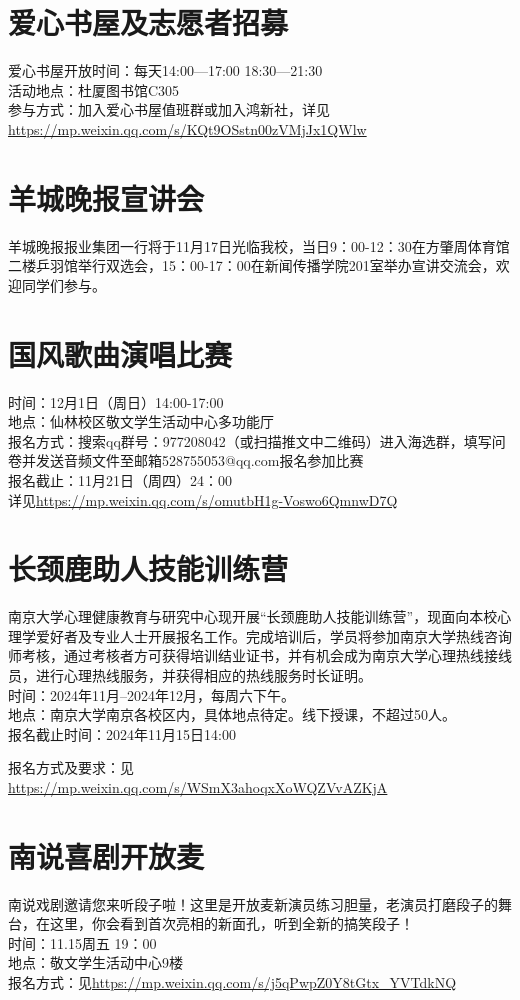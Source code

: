 \documentclass[letterpaper, 12pt]{article}
\begin{document}
\begin{multicols}{2}
\section{爱心书屋及志愿者招募}
爱心书屋开放时间：每天14:00—17:00  18:30—21:30\\
活动地点：杜厦图书馆C305\\
参与方式：加入爱心书屋值班群或加入鸿新社，详见\url{https://mp.weixin.qq.com/s/KQt9OSstn00zVMjJx1QWlw}

\section{羊城晚报宣讲会}
羊城晚报报业集团一行将于11月17日光临我校，当日9：00-12：30在方肇周体育馆二楼乒羽馆举行双选会，15：00-17：00在新闻传播学院201室举办宣讲交流会，欢迎同学们参与。
\section{国风歌曲演唱比赛}
时间：12月1日（周日）14:00-17:00\\
地点：仙林校区敬文学生活动中心多功能厅\\
报名方式：搜索qq群号：977208042（或扫描推文中二维码）进入海选群，填写问卷并发送音频文件至邮箱528755053@qq.com报名参加比赛\\
报名截止：11月21日（周四）24：00\\
详见\url{https://mp.weixin.qq.com/s/omutbH1g-Voswo6QmnwD7Q}

\section{长颈鹿助人技能训练营}
南京大学心理健康教育与研究中心现开展“长颈鹿助人技能训练营”，现面向本校心理学爱好者及专业人士开展报名工作。完成培训后，学员将参加南京大学热线咨询师考核，通过考核者方可获得培训结业证书，并有机会成为南京大学心理热线接线员，进行心理热线服务，并获得相应的热线服务时长证明。\\
时间：2024年11月--2024年12月，每周六下午。\\
地点：南京大学南京各校区内，具体地点待定。线下授课，不超过50人。\\
报名截止时间：2024年11月15日14:00

报名方式及要求：见\url{https://mp.weixin.qq.com/s/WSmX3ahoqxXoWQZVvAZKjA}\\
\section{南说喜剧开放麦}
南说戏剧邀请您来听段子啦！这里是开放麦新演员练习胆量，老演员打磨段子的舞台，在这里，你会看到首次亮相的新面孔，听到全新的搞笑段子！\\
时间：11.15周五 19：00\\
地点：敬文学生活动中心9楼\\
报名方式：见\url{https://mp.weixin.qq.com/s/j5qPwpZ0Y8tGtx_YVTdkNQ}

\end{multicols}
\end{document}
